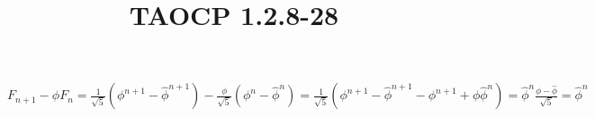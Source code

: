 \documentclass{article}
\title{TAOCP 1.2.8\mbox{-}28}
\begin{document}
\maketitle

\( F_{n+1} - \phi F_{n} = \frac{1}{\sqrt{5}}(\phi^{n+1} - \hat{\phi}^{n+1}) - \frac{\phi}{\sqrt{5}}(\phi^{n} - \hat{\phi}^{n}) = \frac{1}{\sqrt{5}}(\phi^{n+1} - \hat{\phi}^{n+1} - \phi^{n+1} + \phi \hat{\phi}^{n}) = \hat{\phi}^{n} \frac{\phi-\hat{\phi}}{\sqrt{5}} = \hat{\phi}^{n} \)
\end{document}

